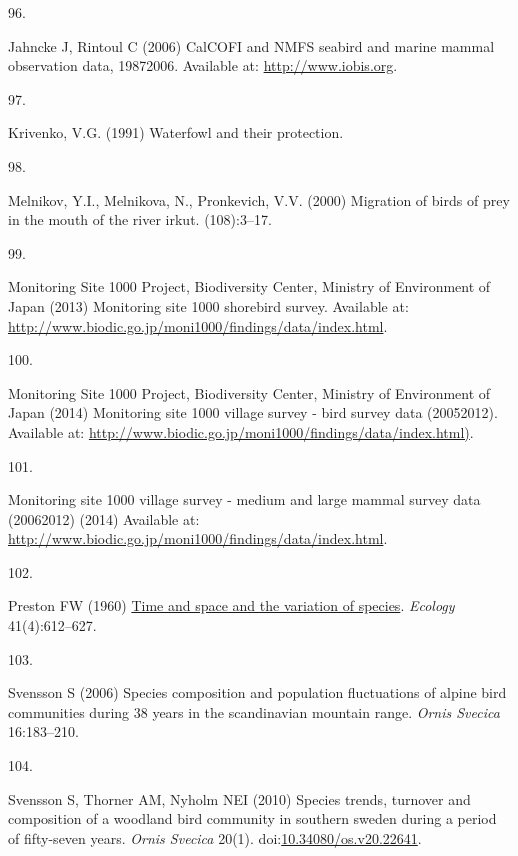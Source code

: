 \documentclass{article}
\newlength{\cslhangindent}
\newlength{\csllabelwidth}
\newlength{\cslentryspacingunit} %
\newenvironment{CSLReferences}[2] %
 {%
  \setlength{\parindent}{0pt}
  \ifodd #1
  \let\oldpar\par
  \def\par{\hangindent=\cslhangindent\oldpar}
  \fi
  \setlength{\parskip}{#2\cslentryspacingunit}
 }%
 {}
\newcommand{\CSLLeftMargin}[1]{\parbox[t]{\csllabelwidth}{#1}}
\newcommand{\CSLRightInline}[1]{\parbox[t]{\linewidth - \csllabelwidth}{#1}\break}
\begin{document}
\begin{CSLReferences}{0}{0}
\leavevmode{}%
\CSLLeftMargin{96. }%
\CSLRightInline{Jahncke J, Rintoul C (2006) CalCOFI and NMFS seabird and
marine mammal observation data, 1987{\textendash}2006. Available at:
\url{http://www.iobis.org}.}

\leavevmode{}%
\CSLLeftMargin{97. }%
\CSLRightInline{Krivenko, V.G. (1991) Waterfowl and their protection.}

\leavevmode{}%
\CSLLeftMargin{98. }%
\CSLRightInline{Melnikov, Y.I., Melnikova, N., Pronkevich, V.V. (2000)
Migration of birds of prey in the mouth of the river irkut.
(108):3--17.}

\leavevmode{}%
\CSLLeftMargin{99. }%
\CSLRightInline{Monitoring Site 1000 Project, Biodiversity Center,
Ministry of Environment of Japan (2013) Monitoring site 1000 shorebird
survey. Available at:
\url{http://www.biodic.go.jp/moni1000/findings/data/index.html}.}

\leavevmode{}%
\CSLLeftMargin{100. }%
\CSLRightInline{Monitoring Site 1000 Project, Biodiversity Center,
Ministry of Environment of Japan (2014) Monitoring site 1000 village
survey - bird survey data (2005{\textendash}2012). Available at:
\url{http://www.biodic.go.jp/moni1000/findings/data/index.html)}.}

\leavevmode{}%
\CSLLeftMargin{101. }%
\CSLRightInline{Monitoring site 1000 village survey - medium and large
mammal survey data (2006{\textendash}2012) (2014) Available at:
\url{http://www.biodic.go.jp/moni1000/findings/data/index.html}.}

\leavevmode{}%
\CSLLeftMargin{102. }%
\CSLRightInline{Preston FW (1960)
\href{https://doi.org/10.2307/1931793}{Time and space and the variation
of species}. \emph{Ecology} 41(4):612--627.}

\leavevmode{}%
\CSLLeftMargin{103. }%
\CSLRightInline{Svensson S (2006) Species composition and population
fluctuations of alpine bird communities during 38 years in the
scandinavian mountain range. \emph{Ornis Svecica} 16:183--210.}

\leavevmode{}%
\CSLLeftMargin{104. }%
\CSLRightInline{Svensson S, Thorner AM, Nyholm NEI (2010) Species
trends, turnover and composition of a woodland bird community in
southern sweden during a period of fifty-seven years. \emph{Ornis
Svecica} 20(1).
doi:\href{https://doi.org/10.34080/os.v20.22641}{10.34080/os.v20.22641}.}


\end{CSLReferences}
\end{document}
